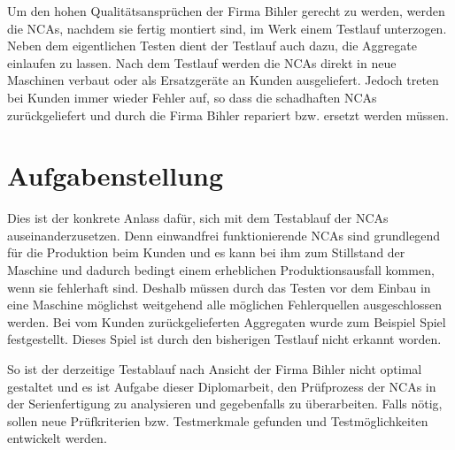 Um den hohen Qualitätsansprüchen der Firma Bihler gerecht zu werden, werden die NCAs, nachdem sie fertig montiert sind, im Werk einem Testlauf unterzogen. Neben dem eigentlichen Testen dient der Testlauf auch dazu, die Aggregate einlaufen zu lassen. Nach dem Testlauf werden die NCAs direkt in neue Maschinen verbaut oder als Ersatzgeräte an Kunden ausgeliefert. Jedoch treten bei Kunden immer wieder Fehler auf, so dass die schadhaften NCAs zurückgeliefert und durch die Firma Bihler repariert bzw. ersetzt werden müssen.


\section{Aufgabenstellung}

Dies ist der konkrete Anlass dafür, sich mit dem Testablauf der NCAs auseinanderzusetzen. Denn einwandfrei funktionierende NCAs sind grundlegend für die Produktion beim Kunden und es kann bei ihm zum Stillstand der Maschine und dadurch bedingt einem erheblichen Produktionsausfall kommen, wenn sie fehlerhaft sind. Deshalb müssen durch das Testen vor dem Einbau in eine Maschine möglichst weitgehend alle möglichen Fehlerquellen ausgeschlossen werden. Bei vom Kunden zurückgelieferten Aggregaten wurde zum Beispiel Spiel festgestellt. Dieses Spiel ist durch den bisherigen Testlauf nicht erkannt worden.




So ist der derzeitige Testablauf nach Ansicht der Firma Bihler nicht optimal gestaltet und es ist Aufgabe dieser Diplomarbeit, den Prüfprozess der NCAs in der Serienfertigung zu analysieren und gegebenfalls zu überarbeiten. Falls nötig, sollen neue Prüfkriterien bzw. Testmerkmale gefunden und Testmöglichkeiten entwickelt werden. 

